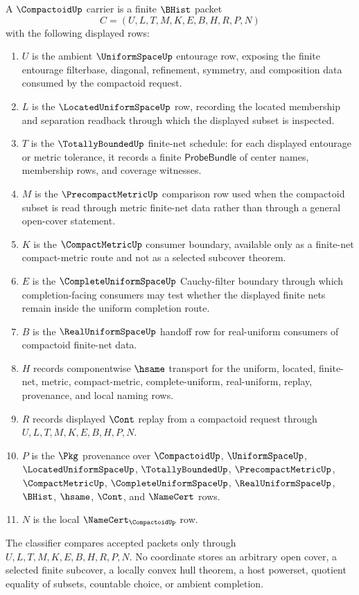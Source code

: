 \begin{definition}
\label{def:compactoid-carrier}
A $\CompactoidUp$ carrier is a finite $\BHist$ packet
$$
C=(U,L,T,M,K,E,B,H,R,P,N)
$$
with the following displayed rows:
\begin{enumerate}
\item $U$ is the ambient $\UniformSpaceUp$ entourage row, exposing the finite entourage filterbase, diagonal, refinement, symmetry, and composition data consumed by the compactoid request.
\item $L$ is the $\LocatedUniformSpaceUp$ row, recording the located membership and separation readback through which the displayed subset is inspected.
\item $T$ is the $\TotallyBoundedUp$ finite-net schedule: for each displayed entourage or metric tolerance, it records a finite $\mathsf{ProbeBundle}$ of center names, membership rows, and coverage witnesses.
\item $M$ is the $\PrecompactMetricUp$ comparison row used when the compactoid subset is read through metric finite-net data rather than through a general open-cover statement.
\item $K$ is the $\CompactMetricUp$ consumer boundary, available only as a finite-net compact-metric route and not as a selected subcover theorem.
\item $E$ is the $\CompleteUniformSpaceUp$ Cauchy-filter boundary through which completion-facing consumers may test whether the displayed finite nets remain inside the uniform completion route.
\item $B$ is the $\RealUniformSpaceUp$ handoff row for real-uniform consumers of compactoid finite-net data.
\item $H$ records componentwise $\hsame$ transport for the uniform, located, finite-net, metric, compact-metric, complete-uniform, real-uniform, replay, provenance, and local naming rows.
\item $R$ records displayed $\Cont$ replay from a compactoid request through $U,L,T,M,K,E,B,H,P,N$.
\item $P$ is the $\Pkg$ provenance over $\CompactoidUp$, $\UniformSpaceUp$, $\LocatedUniformSpaceUp$, $\TotallyBoundedUp$, $\PrecompactMetricUp$, $\CompactMetricUp$, $\CompleteUniformSpaceUp$, $\RealUniformSpaceUp$, $\BHist$, $\hsame$, $\Cont$, and $\NameCert$ rows.
\item $N$ is the local $\NameCert_{\CompactoidUp}$ row.
\end{enumerate}
The classifier compares accepted packets only through $U,L,T,M,K,E,B,H,R,P,N$. No coordinate stores an arbitrary open cover, a selected finite subcover, a locally convex hull theorem, a host powerset, quotient equality of subsets, countable choice, or ambient completion.
\end{definition}

